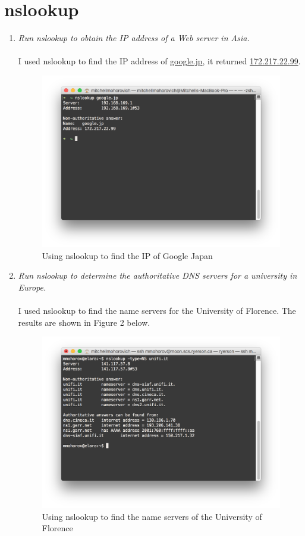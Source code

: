\documentclass[12pt]{article}
\begin{document}
\section{nslookup}
\begin{enumerate}
	\item{\textit{Run nslookup to obtain the IP address of a Web server in Asia.}}\\ \\
		I used nslookup to find the IP address of \url{google.jp}, it returned \url{172.217.22.99}. 

		\begin{figure}[H]
			\includegraphics[width=1\textwidth]{google_japan}%
			\caption{Using nslookup to find the IP of Google Japan}
		\end{figure}

	\item{\textit{Run nslookup to determine the authoritative DNS servers for a university in Europe.}}\\ \\
		I used nslookup to find the name servers for the University of Florence. The results are shown in Figure 2 below.

		\begin{figure}[H]
			\includegraphics[width=1\textwidth]{florence_university}%
			\caption{Using nslookup to find the name servers of the University of Florence}
		\end{figure}


\end{enumerate}
\end{document}
